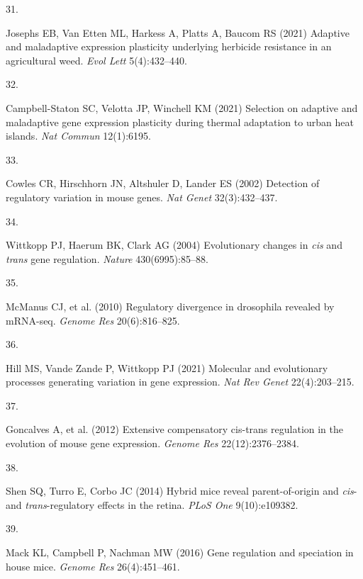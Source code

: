 \documentclass[9pt,twocolumn,twoside,lineno]{pnas-new}
\newlength{\cslhangindent}
\newlength{\csllabelwidth}
\newlength{\cslentryspacingunit} %
\newenvironment{CSLReferences}[2] %
 {%
  \setlength{\parindent}{0pt}
  \ifodd #1
  \let\oldpar\par
  \def\par{\hangindent=\cslhangindent\oldpar}
  \fi
  \setlength{\parskip}{#2\cslentryspacingunit}
 }%
 {}
\newcommand{\CSLLeftMargin}[1]{\parbox[t]{\csllabelwidth}{#1}}
\newcommand{\CSLRightInline}[1]{\parbox[t]{\linewidth - \csllabelwidth}{#1}\break}
\begin{document}
\begin{CSLReferences}{0}{0}
\leavevmode{}%
\CSLLeftMargin{31. }%
\CSLRightInline{Josephs EB, Van Etten ML, Harkess A, Platts A, Baucom RS
(2021) Adaptive and maladaptive expression plasticity underlying
herbicide resistance in an agricultural weed. \emph{Evol Lett}
5(4):432--440.}

\leavevmode{}%
\CSLLeftMargin{32. }%
\CSLRightInline{Campbell-Staton SC, Velotta JP, Winchell KM (2021)
Selection on adaptive and maladaptive gene expression plasticity during
thermal adaptation to urban heat islands. \emph{Nat Commun} 12(1):6195.}

\leavevmode{}%
\CSLLeftMargin{33. }%
\CSLRightInline{Cowles CR, Hirschhorn JN, Altshuler D, Lander ES (2002)
Detection of regulatory variation in mouse genes. \emph{Nat Genet}
32(3):432--437.}

\leavevmode{}%
\CSLLeftMargin{34. }%
\CSLRightInline{Wittkopp PJ, Haerum BK, Clark AG (2004) Evolutionary
changes in \emph{cis} and \emph{trans} gene regulation. \emph{Nature}
430(6995):85--88.}

\leavevmode{}%
\CSLLeftMargin{35. }%
\CSLRightInline{McManus CJ, et al. (2010) Regulatory divergence in
drosophila revealed by {mRNA-seq}. \emph{Genome Res} 20(6):816--825.}

\leavevmode{}%
\CSLLeftMargin{36. }%
\CSLRightInline{Hill MS, Vande Zande P, Wittkopp PJ (2021) Molecular and
evolutionary processes generating variation in gene expression.
\emph{Nat Rev Genet} 22(4):203--215.}

\leavevmode{}%
\CSLLeftMargin{37. }%
\CSLRightInline{Goncalves A, et al. (2012) Extensive compensatory
cis-trans regulation in the evolution of mouse gene expression.
\emph{Genome Res} 22(12):2376--2384.}

\leavevmode{}%
\CSLLeftMargin{38. }%
\CSLRightInline{Shen SQ, Turro E, Corbo JC (2014) Hybrid mice reveal
parent-of-origin and \emph{cis}- and \emph{trans}-regulatory effects in
the retina. \emph{PLoS One} 9(10):e109382.}

\leavevmode{}%
\CSLLeftMargin{39. }%
\CSLRightInline{Mack KL, Campbell P, Nachman MW (2016) Gene regulation
and speciation in house mice. \emph{Genome Res} 26(4):451--461.}


\end{CSLReferences}
\end{document}
